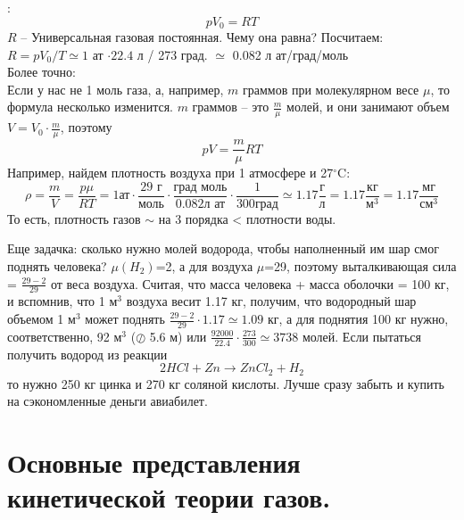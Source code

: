 :\\

\begin{equation}
pV_0=RT
\end{equation}
$R$ -- Универсальная газовая постоянная. Чему она равна? Посчитаем:\\
 $R=pV_0/T\simeq 1$ ат $\cdot 22.4$ л / 273 град. $\simeq$ 0.082 л ат/град/моль\\

Более точно:
\\

Если у нас не 1 моль газа, а, например, $m$ граммов при молекулярном весе $\mu$, то формула несколько изменится. $m$ граммов -- это $\frac m\mu$ молей, и они занимают объем $V=V_0\cdot\frac m\mu$, поэтому
\begin{displaymath}
pV=\frac m\mu RT
\end{displaymath}
Например, найдем плотность воздуха при 1 атмосфере и 27$^\circ$C:
\begin{displaymath}
\rho=\frac mV =\frac {p\mu}{RT} = 1\texttt{ат}\cdot\frac{29\texttt{ г}}{\texttt{моль}}\cdot
       \frac{\texttt{град моль}}{0.082\texttt{л ат}}\cdot\frac1{300 \texttt{град}}
       \simeq1.17\frac{\texttt{г}}{\texttt{л}}=1.17\frac{\texttt{кг}}{\texttt{м}^3}
       =1.17\frac{\texttt{мг}}{\texttt{см}^3}
\end{displaymath}
То есть, плотность газов $\sim$ на 3 порядка < плотности воды.

Еще задачка: сколько нужно молей водорода, чтобы наполненный им шар смог поднять человека? $\mu(H_2)$=2, а для воздуха $\mu$=29, поэтому выталкивающая сила = $\frac{29-2}{29}$ от веса воздуха. Считая, что масса человека + масса оболочки = 100 кг, и вспомнив, что 1 м$^3$ воздуха весит 1.17 кг, получим, что водородный шар объемом 1 м$^3$ может поднять $\frac{29-2}{29}\cdot1.17\simeq1.09$ кг, а для поднятия 100 кг нужно, соответственно, 92 м$^3$ ($\oslash$ 5.6 м) или $\frac{92000}{22.4}\cdot\frac{273}{300}\simeq3738$ молей. Если пытаться получить водород из реакции
\begin{displaymath}
2HCl+Zn\rightarrow ZnCl_2+H_2
\end{displaymath}
то нужно 250 кг цинка и 270 кг соляной кислоты. Лучше сразу забыть и купить на сэкономленные деньги авиабилет.

\section{ Основные представления кинетической теории газов.}

